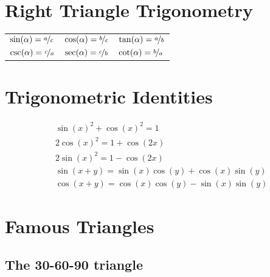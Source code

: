 \documentclass[letterpaper,9pt,fleqn]{extarticle}
\begin{document}
\begin{multicols*}{3}
\section*{Right Triangle Trigonometry}
\vspace{-0.35in}

   \begin{tabular}{lll}
   $\sin(\alpha) = \nicefrac{a}{c}$ & $\cos(\alpha) = \nicefrac{b}{c}$ & $\tan(\alpha) = \nicefrac{a}{b}$\\[1ex]
   $\csc(\alpha) = \nicefrac{c}{a}$ & $\sec(\alpha) = \nicefrac{c}{b}$ & $\cot(\alpha) = \nicefrac{b}{a}$  \\
   \end{tabular}
\vspace{-0.25in}
\section*{Trigonometric Identities}
\vspace{-0.05in}
\begin{minipage}[c]{0.333\textwidth}

\vspace{-0.335in}
\begin{align*}
&\sin(x)^2 + \cos(x)^2 =1 \\
&2 \cos(x)^2 =  1 + \cos(2 x)\\
&2 \sin(x)^2 = 1 - \cos(2 x)\\
 &\sin\left(x +  y\right) =\sin (x) \cos (y) + \cos (x) \sin (y) \\
&\cos\left(x+y\right)=\cos (x) \cos (y) - \sin (x) \sin (y)    
\end{align*}
\end{minipage}




\section*{Famous Triangles}
\vspace{-0.3in}
\subsection*{The 30-60-90 triangle}


\end{multicols*}
\end{document}
